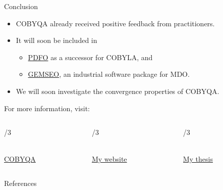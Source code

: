 \documentclass[optimization]{common/talk}
\begin{document}
\begin{frame}{Conclusion}

    \begin{itemize}
        \item COBYQA already received \alert{positive} feedback from practitioners.
        \item It will soon be included in
        \begin{itemize}
            \item \href{https://www.pdfo.net}{PDFO} as a successor for COBYLA, and
            \item \href{https://gemseo.readthedocs.io}{GEMSEO}, an \alert{industrial} software package for MDO.
        \end{itemize}
        \item We will soon investigate the convergence properties of COBYQA.
    \end{itemize}

    For more information, visit:

    \medskip

    \begin{columns}
        \begin{column}{\textwidth/3}
            \begin{center}
                \\[1ex]
                \href{https://www.cobyqa.com}{COBYQA}
            \end{center}
        \end{column}
        \begin{column}{\textwidth/3}
            \begin{center}
                \\[1ex]
                \href{https://www.tomragonneau.com}{My website}
            \end{center}
        \end{column}
        \begin{column}{\textwidth/3}
            \begin{center}
                \\[1ex]
                \href{https://tomragonneau.com/documents/thesis.pdf}{My thesis}
            \end{center}
        \end{column}
    \end{columns}
\end{frame}

\appendix

\begin{frame}[t,allowframebreaks]{References}
    \printbibliography[heading=none]
\end{frame}
\end{document}
